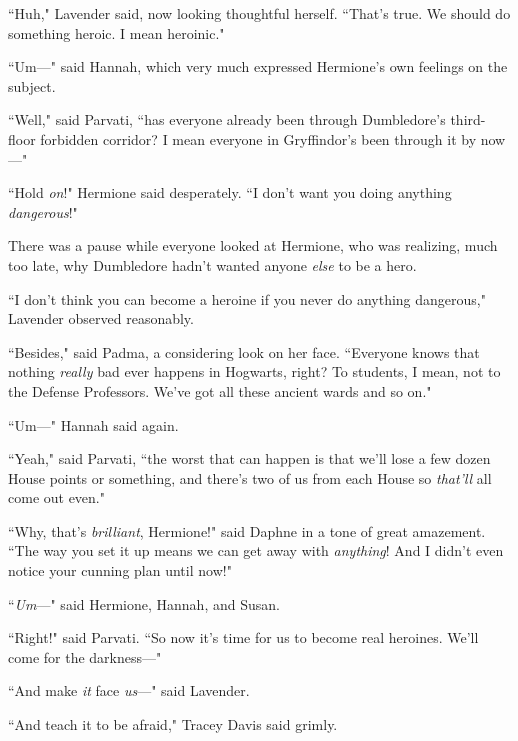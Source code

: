 ``Huh," Lavender said, now looking thoughtful herself. ``That's true. We should do something heroic. I mean heroinic."

``Um—" said Hannah, which very much expressed Hermione's own feelings on the subject.

``Well," said Parvati, ``has everyone already been through Dumbledore's third-floor forbidden corridor? I mean everyone in Gryffindor's been through it by now—"

``Hold \emph{on}!" Hermione said desperately. ``I don't want you doing anything \emph{dangerous}!"

There was a pause while everyone looked at Hermione, who was realizing, much too late, why Dumbledore hadn't wanted anyone \emph{else} to be a hero.

``I don't think you can become a heroine if you never do anything dangerous," Lavender observed reasonably.

``Besides," said Padma, a considering look on her face. ``Everyone knows that nothing \emph{really} bad ever happens in Hogwarts, right? To students, I mean, not to the Defense Professors. We've got all these ancient wards and so on."

``Um—" Hannah said again.

``Yeah," said Parvati, ``the worst that can happen is that we'll lose a few dozen House points or something, and there's two of us from each House so \emph{that'll} all come out even."

``Why, that's \emph{brilliant}, Hermione!" said Daphne in a tone of great amazement. ``The way you set it up means we can get away with \emph{anything}! And I didn't even notice your cunning plan until now!"

``\emph{Um}—" said Hermione, Hannah, and Susan.

``Right!" said Parvati. ``So now it's time for us to become real heroines. We'll come for the darkness—"

``And make \emph{it} face \emph{us}—" said Lavender.

``And teach it to be afraid," Tracey Davis said grimly.

